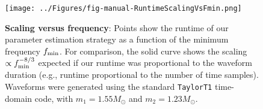 \begin{figure}
\texttt{[image: ../Figures/fig-manual-RuntimeScalingVsFmin.png]}
\caption{\label{fig:fmin_scaling}\textbf{Scaling versus frequency}: Points show the runtime of our parameter estimation strategy as a function
  of the minimum frequency $f_{\rm min}$.  For comparison, the solid curve shows the scaling $\propto f_{\rm
    min}^{-8/3}$ expected if our runtime was proportional to the waveform duration (e.g., runtime proportional to the
  number of time samples). 
 Waveforms were generated using the standard \texttt{TaylorT1} time-domain code, with $m_1=1.55 M_\odot$ and $m_2=1.23 M_\odot$. 
}
\end{figure}

